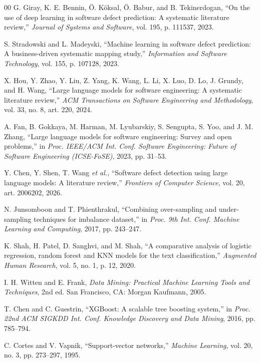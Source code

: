 \documentclass[conference,a4paper]{IEEEtran}
\begin{document}
\begin{thebibliography}{00}
 G. Giray, K. E. Bennin, \"O. K\"oksal, \"O. Babur, and B. Tekinerdogan, ``On the use of deep learning in software defect prediction: A systematic literature review,'' \textit{Journal of Systems and Software}, vol. 195, p. 111537, 2023.

 S. Stradowski and L. Madeyski, ``Machine learning in software defect prediction: A business-driven systematic mapping study,'' \textit{Information and Software Technology}, vol. 155, p. 107128, 2023.

 X. Hou, Y. Zhao, Y. Liu, Z. Yang, K. Wang, L. Li, X. Luo, D. Lo, J. Grundy, and H. Wang, ``Large language models for software engineering: A systematic literature review,'' \textit{ACM Transactions on Software Engineering and Methodology}, vol. 33, no. 8, art. 220, 2024.

 A. Fan, B. Gokkaya, M. Harman, M. Lyubarskiy, S. Sengupta, S. Yoo, and J. M. Zhang, ``Large language models for software engineering: Survey and open problems,'' in \textit{Proc. IEEE/ACM Int. Conf. Software Engineering: Future of Software Engineering (ICSE-FoSE)}, 2023, pp. 31--53.

 Y. Chen, Y. Shen, T. Wang \textit{et al.}, ``Software defect detection using large language models: A literature review,'' \textit{Frontiers of Computer Science}, vol. 20, art. 2006202, 2026.   %


 N. Junsomboon and T. Phienthrakul, ``Combining over-sampling and under-sampling techniques for imbalance dataset,'' in \textit{Proc. 9th Int. Conf. Machine Learning and Computing}, 2017, pp. 243--247.

 K. Shah, H. Patel, D. Sanghvi, and M. Shah, ``A comparative analysis of logistic regression, random forest and KNN models for the text classification,'' \textit{Augmented Human Research}, vol. 5, no. 1, p. 12, 2020.

 I. H. Witten and E. Frank, \textit{Data Mining: Practical Machine Learning Tools and Techniques}, 2nd ed. San Francisco, CA: Morgan Kaufmann, 2005.

 T. Chen and C. Guestrin, ``XGBoost: A scalable tree boosting system,'' in \textit{Proc. 22nd ACM SIGKDD Int. Conf. Knowledge Discovery and Data Mining}, 2016, pp. 785--794.

 C. Cortes and V. Vapnik, ``Support-vector networks,'' \textit{Machine Learning}, vol. 20, no. 3, pp. 273--297, 1995.


\end{thebibliography}
\end{document}
